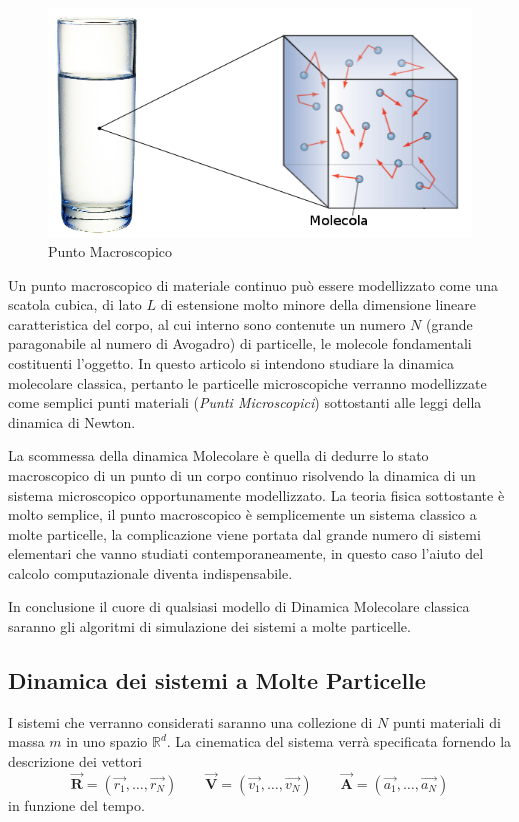 \documentclass[11pt]{article}
\theoremstyle{plain}
\theoremstyle{remark}
\begin{document}
\begin{figure}[htbp]
\centering
\includegraphics[scale=0.5]{Immagini/PuntoMacro.png}
\caption[Punto Macroscopico]{Punto Macroscopico}\label{fig: PuntoMacro}
\end{figure}

Un punto macroscopico di materiale continuo può essere modellizzato come una scatola cubica, di lato $L$ di estensione molto minore della dimensione lineare caratteristica del corpo, al cui interno sono contenute un numero $N$ (grande paragonabile al numero di Avogadro) di particelle, le molecole fondamentali costituenti l'oggetto.
In questo articolo si intendono studiare la dinamica molecolare classica, pertanto le particelle microscopiche verranno modellizzate come semplici punti materiali (\emph{Punti Microscopici}) sottostanti alle leggi della dinamica di Newton.

La scommessa della dinamica Molecolare è quella di dedurre lo stato macroscopico di un punto di un corpo continuo risolvendo la dinamica di un sistema microscopico opportunamente modellizzato.
La teoria fisica sottostante è molto semplice, il punto macroscopico è semplicemente un sistema classico  a molte particelle, la complicazione viene portata dal grande numero di sistemi elementari che vanno studiati contemporaneamente, in questo caso l'aiuto del calcolo computazionale diventa indispensabile. 

In conclusione il cuore di qualsiasi modello di Dinamica Molecolare classica saranno gli algoritmi di simulazione dei sistemi a molte particelle.

\subsection{Dinamica dei sistemi a Molte Particelle}\label{cap: Intro dinamica}
I sistemi che verranno considerati saranno una collezione di $N$ punti materiali di massa $m$ in uno spazio $\mathbb{R}^d$.
La cinematica del sistema verrà specificata fornendo la descrizione dei vettori
\begin{displaymath}
\vec{\mathbf{R}}=(\vec{r_1},\ldots,\vec{r_N}) \qquad \vec{\mathbf{V}}=(\vec{v_1},\ldots,\vec{v_N}) \qquad \vec{\mathbf{A}}=(\vec{a_1},\ldots,\vec{a_N}) 
\end{displaymath}
in funzione del tempo.
\end{document}
